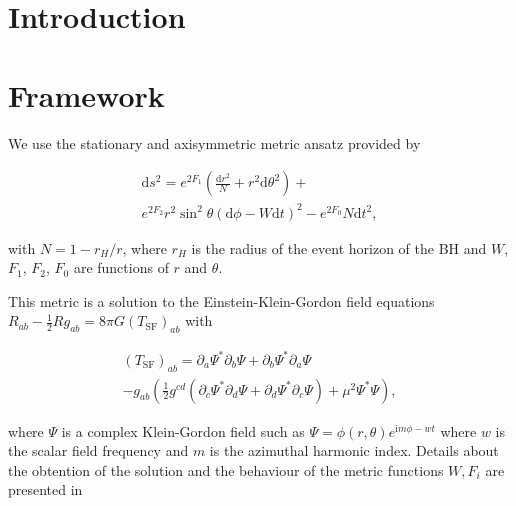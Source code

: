 \documentclass[twocolumn,aps,showpacs,showkeys,prd,superscriptaddress,byrevtex, amsmath]{revtex4-1}
\begin{document}

\section{Introduction}

\section{Framework}

We use the stationary and axisymmetric metric ansatz provided by\cite{Herdeiro:2014a}

\begin{equation}
\begin{split}
\mathrm{d}s^2 = e^{2F_1}\left(\frac{\mathrm{d}r^2}{N} + r^2\mathrm{d}\theta^2\right) + \\ e^{2F_2}r^2\sin^2 \theta(\mathrm{d}\phi-W\mathrm{d}t)^2 -  e^{2F_0}N\mathrm{d}t^2,
\end{split}
\end{equation}

with $N = 1 - r_H/r$, where $r_H$ is the radius of the event horizon of the BH and $W$, $F_1$, $F_2$, $F_0$ are functions of $r$ and $\theta$.

This metric is a solution to the Einstein-Klein-Gordon field equations $R_{ab} - \frac{1}{2}R g _{ab} = 8 \pi G (T_{\mathrm{SF}})_{ab}$ with 

\begin{equation}\label{eq:e-m_scalaf_field}
\begin{split}
(T_{\mathrm{SF}})_{ab} = \partial_a \Psi^* \partial_b \Psi + \partial_b \Psi^* \partial_a \Psi \\ - g_{ab} \left(\frac{1}{2} g^{cd}(\partial_c \Psi^* \partial_d \Psi + \partial_d \Psi^* \partial_c \Psi) + \mu^2 \Psi^* \Psi \right),
\end{split}
\end{equation}

where $\Psi$ is a complex Klein-Gordon field such as $\Psi = \phi(r, \theta) e^{\mathrm{i}m\phi - w t}$ where $w$ is the scalar field frequency and $m$ is the azimuthal harmonic index. Details about the obtention of the solution and the behaviour of the metric functions ${W, F_i}$ are presented in~\cite{Herdeiro:2015b}
\end{document}
